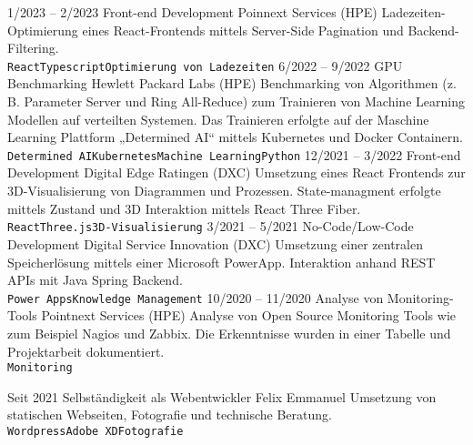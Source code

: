 \documentclass[9pt]{developercv} %
\begin{document}
\begin{entrylist}
	\entry
	{1/2023 -- 2/2023}
	{Front-end Development}
	{Poinnext Services (HPE)}
	{Ladezeiten-Optimierung eines React-Frontends mittels Server-Side Pagination und Backend-Filtering.\\ \texttt{React}\slashsep\texttt{Typescript}\slashsep\texttt{Optimierung von Ladezeiten}}
	\entry
	{6/2022 -- 9/2022}
	{GPU Benchmarking}
	{Hewlett Packard Labs (HPE)}
	{Benchmarking von Algorithmen (z. B. Parameter Server und Ring All-Reduce) zum Trainieren von Machine Learning Modellen auf verteilten Systemen. Das Trainieren erfolgte auf der Maschine Learning Plattform „Determined AI“ mittels Kubernetes und Docker Containern. \\ \texttt{Determined AI}\slashsep\texttt{Kubernetes}\slashsep\texttt{Machine Learning}\slashsep\texttt{Python}}
	\entry
	{12/2021 -- 3/2022}
	{Front-end Development}
	{Digital Edge Ratingen (DXC)}
	{Umsetzung eines React Frontends zur 3D-Visualisierung von Diagrammen und Prozessen. State-managment erfolgte mittels Zustand und 3D Interaktion mittels React Three Fiber. \\ \texttt{React}\slashsep\texttt{Three.js}\slashsep\texttt{3D-Visualisierung}}
	\entry
	{3/2021 -- 5/2021}
	{No-Code/Low-Code Development}
	{Digital Service Innovation (DXC)}
	{Umsetzung einer zentralen Speicherlösung mittels einer Microsoft PowerApp. Interaktion anhand REST APIs mit Java Spring Backend. \\ \texttt{Power Apps}\slashsep\texttt{Knowledge Management}}
	\entry
	{10/2020 -- 11/2020}
	{Analyse von Monitoring-Tools}
	{Pointnext Services (HPE)}
	{Analyse von Open Source Monitoring Tools wie zum Beispiel Nagios und Zabbix. Die Erkenntnisse wurden in einer Tabelle und Projektarbeit dokumentiert. \\ \texttt{Monitoring}}
\end{entrylist}

\vspace{0.5cm}

\begin{entrylist}
	\entry
	{Seit 2021}
	{Selbständigkeit als Webentwickler}
	{Felix Emmanuel}
	{Umsetzung von statischen Webseiten, Fotografie und technische Beratung. \\ \texttt{Wordpress}\slashsep\texttt{Adobe XD}\slashsep\texttt{Fotografie}}
\end{entrylist}

\end{document}
